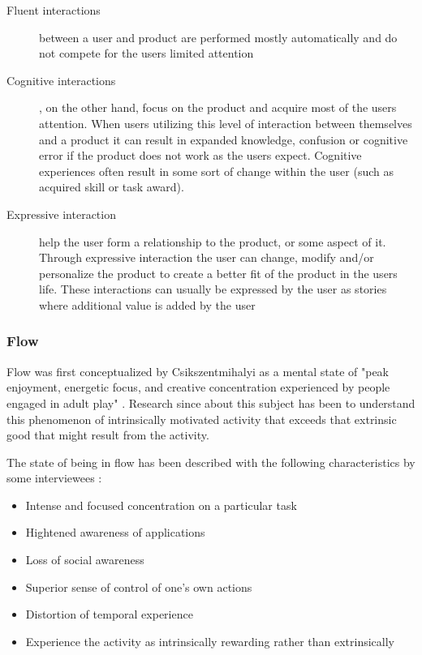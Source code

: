 \begin{description}
  \item[Fluent interactions] between a user and product are performed mostly automatically and do not compete for the users limited attention
  \item[Cognitive interactions], on the other hand, focus on the product and acquire most of the users attention. When users utilizing this level of interaction between themselves and a product it can result in expanded knowledge, confusion or cognitive error if the product does not work as the users expect. Cognitive experiences often result in some sort of change within the user (such as acquired skill or task award).
  \item[Expressive interaction] help the user form a relationship to the product, or some aspect of it. Through expressive interaction the user can change, modify and/or personalize the product to create a better fit of the product in the users life. These interactions can usually be expressed by the user as stories where additional value is added by the user
\end{description}

\subsubsection{Flow}
Flow was first conceptualized by Csikszentmihalyi as a mental state of "peak enjoyment, energetic focus, and creative concentration experienced by people engaged in adult play" \cite{Csikszentmihalyi1975}. Research since about this subject has been to understand this phenomenon of intrinsically motivated activity that exceeds that extrinsic good that might result from the activity.

The state of being in flow has been described with the following characteristics by some interviewees \cite{Nakamura2005}:

\begin{itemize}
  \item Intense and focused concentration on a particular task
  \item Hightened awareness of applications
  \item Loss of social awareness
  \item Superior sense of control of one's own actions
  \item Distortion of temporal experience
  \item Experience the activity as intrinsically rewarding rather than extrinsically
\end{itemize}

